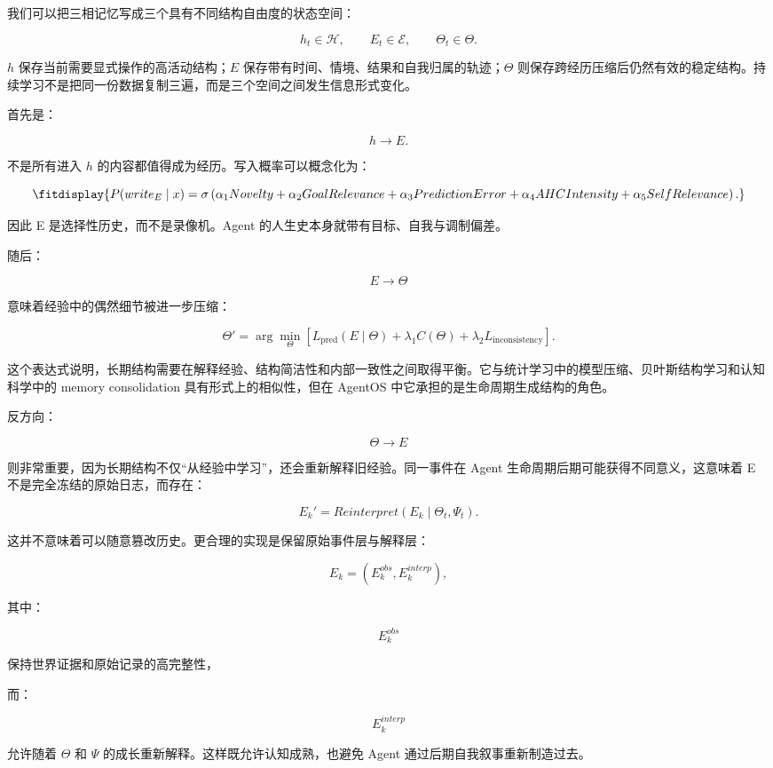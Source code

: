 我们可以把三相记忆写成三个具有不同结构自由度的状态空间：

\[
h_t\in\mathcal{H},
\qquad
E_t\in\mathcal{E},
\qquad
\Theta_t\in\mathcal{\Theta}.
\]

$h$ 保存当前需要显式操作的高活动结构；$E$ 保存带有时间、情境、结果和自我归属的轨迹；$\Theta$ 则保存跨经历压缩后仍然有效的稳定结构。持续学习不是把同一份数据复制三遍，而是三个空间之间发生信息形式变化。

首先是：

\[
h\rightarrow E.
\]

不是所有进入 $h$ 的内容都值得成为经历。写入概率可以概念化为：

\[
\fitdisplay{
P(write_E\mid x)
=
\sigma
\left(
\alpha_1 Novelty
+
\alpha_2 GoalRelevance
+
\alpha_3 PredictionError
+
\alpha_4 AHCIntensity
+
\alpha_5 SelfRelevance
\right).
}
\]

因此 E 是选择性历史，而不是录像机。Agent 的人生史本身就带有目标、自我与调制偏差。

随后：

\[
E\rightarrow\Theta
\]

意味着经验中的偶然细节被进一步压缩：

\[
\Theta'
=
\arg\min_{\Theta}
\left[
L_{\mathrm{pred}}
(E\mid\Theta)
+
\lambda_1C(\Theta)
+
\lambda_2L_{\mathrm{inconsistency}}
\right].
\]

这个表达式说明，长期结构需要在解释经验、结构简洁性和内部一致性之间取得平衡。它与统计学习中的模型压缩、贝叶斯结构学习和认知科学中的 memory consolidation 具有形式上的相似性，但在 AgentOS 中它承担的是生命周期生成结构的角色。

反方向：

\[
\Theta\rightarrow E
\]

则非常重要，因为长期结构不仅“从经验中学习”，还会重新解释旧经验。同一事件在 Agent 生命周期后期可能获得不同意义，这意味着 E 不是完全冻结的原始日志，而存在：

\[
E_k'
=
Reinterpret(E_k\mid\Theta_t,\Psi_t).
\]

这并不意味着可以随意篡改历史。更合理的实现是保留原始事件层与解释层：

\[
E_k
=
(E_k^{obs},E_k^{interp}),
\]

其中：

\[
E_k^{obs}
\]

保持世界证据和原始记录的高完整性，

而：

\[
E_k^{interp}
\]

允许随着 $\Theta$ 和 $\Psi$ 的成长重新解释。这样既允许认知成熟，也避免 Agent 通过后期自我叙事重新制造过去。

